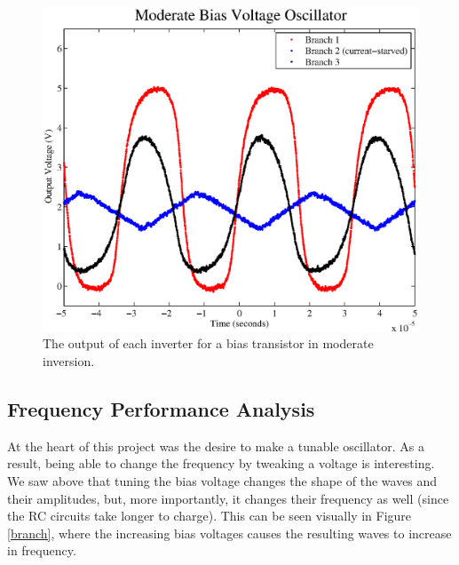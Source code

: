 \documentclass{article}
\begin{document}
\begin{figure}[H]
\centering
\includegraphics[scale=.6]{moderate_bias.eps}
\caption{The output of each inverter for a bias transistor in moderate inversion.}
\label{moderateBias}
\end{figure}

\subsection*{Frequency Performance Analysis}

At the heart of this project was the desire to make a tunable oscillator. As a result, being able to change the frequency by tweaking a voltage is interesting.  We saw above that tuning the bias voltage changes the shape of the waves and their amplitudes, but, more importantly, it changes their frequency as well (since the RC circuits take longer to charge).  This can be seen visually in Figure \ref{branch}, where the increasing bias voltages causes the resulting waves to increase in frequency.
\end{document}
